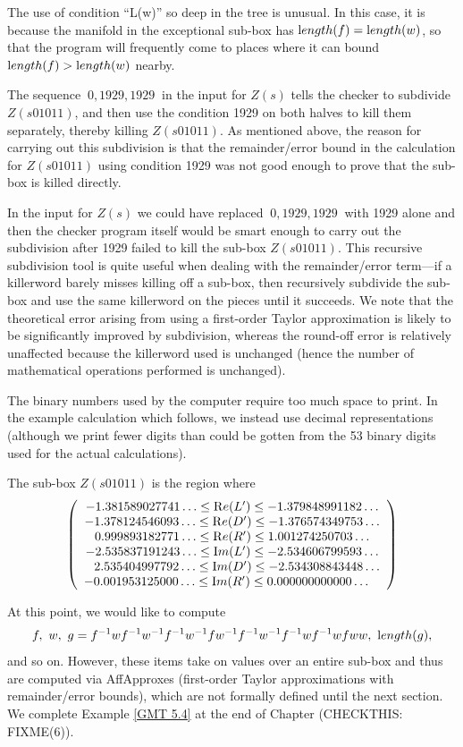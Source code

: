 \begin{example}
The use of condition ``L(w)'' so deep in the tree is unusual.
In this case, it is because the manifold in the exceptional sub-box
has ${\textrm length}(f) = {\textrm length}(w)$, so that the program will frequently
come to places where it can bound ${\textrm length}(f) > {\textrm length}(w)$ nearby.

The sequence $\ 0, 1929, 1929\ $ in the 
input for $Z(s)$ tells the checker to
subdivide $Z(s01011)$, and then use the condition 1929
on both halves to kill   them separately, 
thereby killing $Z(s01011)$.
As mentioned above,
the reason for carrying out this  subdivision 
is that the remainder/error bound in the calculation
 for $Z(s01011)$ using condition 1929 was not good enough
to prove that the sub-box is killed directly. 
 
 


In the input for $Z(s)$ we could have
replaced 
 $\ 0, 1929, 1929\ $ with 1929 alone
and then the checker
program itself would be smart enough to carry out
the subdivision after 1929 failed to kill the sub-box
$Z(s01011).$
This recursive subdivision tool is quite useful when dealing with the 
remainder/error term---if a killerword barely misses killing off a sub-box, then recursively subdivide the sub-box and
use the same killerword on the pieces until it succeeds.   We note that the theoretical error arising from using a
first-order Taylor approximation is likely to be significantly improved by subdivision, whereas the
round-off error is relatively unaffected because the killerword
used is unchanged (hence the number of mathematical operations
performed is unchanged).

The binary numbers used by the computer require too much space to print.
In the example calculation which follows, we instead use decimal 
representations (although we print fewer digits than could
be gotten from the 53 binary digits used for the actual calculations).

The sub-box $Z(s01011)$ is the region where 
$$\left(\begin{array}{c} 
-1.381589027741\ldots  \le  {\mathrm Re}(L')  \le  -1.379848991182\ldots\cr
-1.378124546093\ldots  \le  {\mathrm Re}(D')  \le  -1.376574349753\ldots\cr
0.999893182771\ldots  \le {\mathrm Re}(R')  \le  1.001274250703\ldots\cr
-2.535837191243\ldots  \le  {\mathrm Im}(L')  \le  -2.534606799593\ldots\cr
\phantom{-}2.535404997792\ldots  \le  {\mathrm Im}(D')  \le  -2.534308843448\ldots\cr
-0.001953125000\ldots  \le  {\mathrm Im}(R')  \le  0.000000000000\ldots\phantom{-}\cr
\end{array}\right)$$


At this point, we would like to compute $$f,\ w,\ g = f^{-1}wf^{-1}w^{-1}f^{-1}w^{-1}fw^{-1}f^{-1}w^{-1}f^{-1}wf^{-1}wfww, \ {\textrm length}(g),$$ 
\noindent 
and so on.  
However, these items take on values over an entire sub-box and thus are computed via AffApproxes (first-order Taylor
approximations with remainder/error bounds), which are not formally defined until the next section.  We
complete
Example \ref{GMT 5.4}
 at the end of 
	Chapter (CHECKTHIS: FIXME(6)).  %
\end{example}

